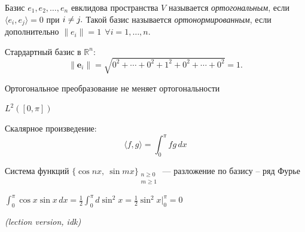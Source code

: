 \begin{definition}
    Базис $e_1, e_2, \dots , e_n$ евклидова пространства $V$ называется \emph{ортогональным}, если $\langle e_i, e_j\rangle = 0$ при
    $i \neq j.\\$
    Такой базис называется \emph{ортонормированным}, если дополнительно $\|e_i\| = 1 \ \ \forall i = 1, \dots ,n.$
\end{definition}

\begin{example}
    Стардартный базис в $\mathbb{R}^n$:
    \[
    \|\mathbf{e}_i\| = \sqrt{0^2 + \cdots + 0^2 + 1^2 + 0^2 + \cdots + 0^2} = 1.
    \]
\end{example}

\begin{stmt}
    Ортогональное преобразование не меняет ортогональности

  \begin{center}
  \end{center}
\end{stmt}


\begin{example}

$L^2([0,\pi])$

Скалярное произведение:
\[
\langle f,g\rangle = \int_0^\pi fg\,dx
\]

Система функций $\bigl\{\cos nx,\ \sin mx\bigr\}_{\substack{n \geq 0 \\ m \geq 1}}$
--- разложение по базису -- ряд Фурье


$\int_0^\pi \cos x \sin x \, dx = \frac{1}{2} \int_0^\pi d\sin^2 x =
\frac{1}{2} \sin^2 x \Big|_0^\pi = 0 $
\par

\emph{(lection version, idk)}

\end{example}


